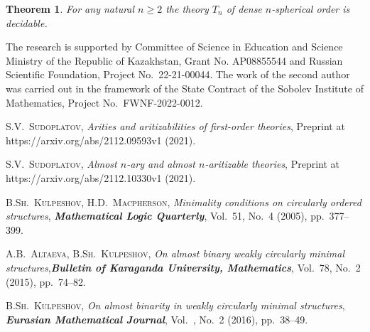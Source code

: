 \documentclass[bsl,meeting]{asl}
\newtheorem{theorem}{Theorem}
\begin{document}
\begin{theorem}\label{th_dec}
For any natural $n\geq 2$ the theory $T_n$ of dense $n$-spherical
order is decidable.
\end{theorem}

The research is supported by Committee of Science in Education and
Science Ministry of the Republic of Kazakhstan, Grant No.
AP08855544 and Russian Scientific Foundation, Project
No.~22-21-00044. The work of the second author was carried out in
the framework of the State Contract of the Sobolev Institute of
Mathematics, Project No.~FWNF-2022-0012.

\begin{thebibliography}{10}

 {\scshape  S.V.~Sudoplatov}, {\itshape Arities and aritizabilities of first-order
theories}, Preprint at https://arxiv.org/abs/2112.09593v1 (2021).

 {\scshape  S.V.~Sudoplatov}, {\itshape Almost $n$-ary and almost $n$-aritizable
theories}, Preprint at https://arxiv.org/abs/2112.10330v1 (2021).

 {\scshape B.Sh.~Kulpeshov, H.D.~Macpherson}, {\itshape Minimality
conditions on circularly ordered structures}, {\bfseries\itshape
Mathematical Logic Quarterly}, Vol.~51, No.~4 (2005),
pp.~377--399.

 {\scshape A.B.~Altaeva, B.Sh.~Kulpeshov},
{\itshape On almost binary weakly circularly minimal
structures},{\bfseries\itshape Bulletin of Karaganda University,
Mathematics}, Vol.~78, No.~2 (2015), pp.~74--82.

 {\scshape B.Sh.~Kulpeshov}, {\itshape On almost binarity in weakly
circularly minimal structures}, {\bfseries\itshape Eurasian
Mathematical Journal}, Vol.~, No.~2 (2016), pp.~38--49.





\end{thebibliography}


\vspace*{-0.5\baselineskip}
\end{document}
